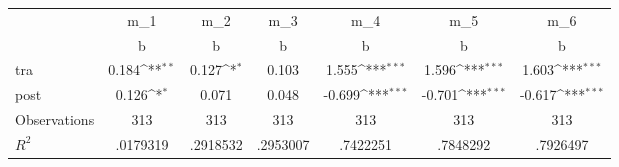{
\def\sym#1{\ifmmode^{#1}\else\(^{#1}\)\fi}
\begin{tabular}{l*{6}{c}}
\toprule
                    &         m\_1         &         m\_2         &         m\_3         &         m\_4         &         m\_5         &         m\_6         \\
                    &           b         &           b         &           b         &           b         &           b         &           b         \\
\midrule
tra                 &       0.184\sym{**} &       0.127\sym{*}  &       0.103         &       1.555\sym{***}&       1.596\sym{***}&       1.603\sym{***}\\
post                &       0.126\sym{*}  &       0.071         &       0.048         &      -0.699\sym{***}&      -0.701\sym{***}&      -0.617\sym{***}\\
\midrule
Observations        &         313         &         313         &         313         &         313         &         313         &         313         \\
\(R^{2}\)           &    .0179319         &    .2918532         &    .2953007         &    .7422251         &    .7848292         &    .7926497         \\
\bottomrule
\end{tabular}
}
